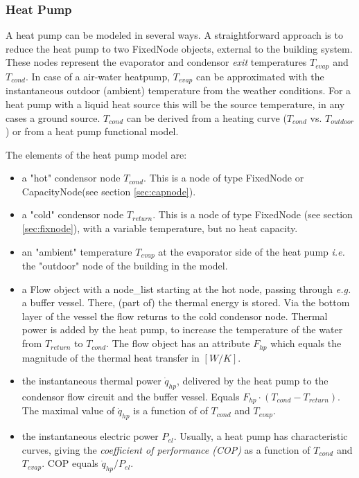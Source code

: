 \subsubsection{Heat Pump}

A heat pump can be modeled in several ways. A straightforward approach is to reduce the heat pump to two \textsf{FixedNode} objects, external to the building system. These nodes represent the evaporator and condensor \emph{exit} temperatures $T_{evap}$ and $T_{cond}$. In case of a air-water heatpump, $T_{evap}$ can be approximated with the instantaneous outdoor (ambient) temperature from the weather conditions. For a heat pump with a liquid heat source this will be the source temperature, in any cases a ground source. $T_{cond}$ can be derived from a heating curve ($T_{cond}$ vs. $T_{outdoor}$) or from a heat pump functional model.

The elements of the heat pump model are:

\begin{itemize}
	\item a "hot" condensor node $T_{cond}$. This is a node of type \textsf{FixedNode} or \textsf{CapacityNode}(see section \ref{sec:capnode}).
	\item a "cold" condensor node $T_{return}$. This is a node of type \textsf{FixedNode} (see section \ref{sec:fixnode}), with a variable temperature, but no heat capacity.
	\item an "ambient" temperature $T_{evap}$ at the evaporator side of the heat pump \textit{i.e.} the "outdoor" node of the building in the model.
	\item a \textsf{Flow} object with a \textsf{node\_list} starting at the hot node, passing through \textit{e.g.} a buffer vessel. There, (part of) the thermal energy is stored. Via the bottom layer of the vessel the flow returns to the cold condensor node.  Thermal power is added by the heat pump, to increase the temperature of the water from $T_{return}$ to $T_{cond}$. The flow object has an attribute $F_{hp}$ which equals the magnitude of the thermal heat transfer in $[W/K]$.
	\item the instantaneous thermal power $\dot{q}_{hp}$, delivered by the heat pump to the condensor flow circuit and the buffer vessel. Equals $F_{hp} \cdot (T_{cond} - T_{return})$. The maximal value of $\dot{q}_{hp}$ is a function of of $T_{cond}$ and $T_{evap}$.
	\item the instantaneous electric power $P_{el}$. Usually, a heat pump has characteristic curves, giving the \emph{coefficient of performance (COP)} as a function of $T_{cond}$ and $T_{evap}$. COP equals $\dot{q}_{hp}/P_{el}$. 
\end{itemize} 

